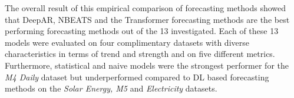 The overall result of this empirical comparison of forecasting methods showed that DeepAR, NBEATS and the Transformer forecasting methods are the  best performing forecasting methods out of the 13 investigated. Each of these 13 models were evaluated on four complimentary datasets with diverse characteristics in terms of trend and strength and on five different metrics. Furthermore, statistical and naive models were the strongest performer for the \textit{M4 Daily} dataset but underperformed compared to DL based forecasting methods on the \textit{Solar Energy, M5} and \textit{Electricity} datasets.